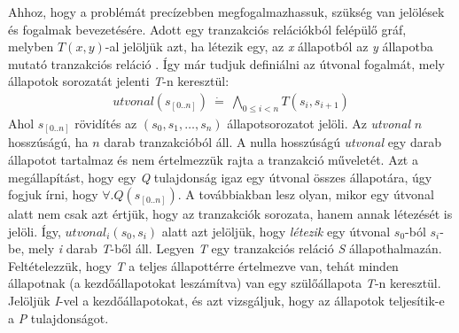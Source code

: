 Ahhoz, hogy a problémát precízebben megfogalmazhassuk, szükség van jelölések és fogalmak bevezetésére. Adott egy tranzakciós relációkból felépülő gráf, melyben $T(x, y)$-al jelöljük azt, ha létezik egy, az \emph{x} állapotból az \emph{y} állapotba mutató tranzakciós reláció \cite{k_induction_article}. Így már tudjuk definiálni az útvonal fogalmát, mely állapotok sorozatát jelenti \emph{T}-n keresztül:
\begin{align}
	utvonal(s_{[0..n]})~\dot{=}~\bigwedge_{0 \leq i < n} T(s_{i}, s_{i+1})
\end{align}
Ahol $s_{[0..n]}$ rövidítés az $(s_{0}, s_{1}, \dots, s_{n})$ állapotsorozatot jelöli. Az \emph{utvonal} $n$ hosszúságú, ha $n$ darab tranzakcióból áll. A nulla hosszúságú \emph{utvonal} egy darab állapotot tartalmaz és nem értelmezzük rajta a tranzakció műveletét. Azt a megállapítást, hogy egy \emph{Q} tulajdonság igaz egy útvonal összes állapotára, úgy fogjuk írni, hogy $\forall . Q(s_{[0..n]})$.
\newline
\newline
A továbbiakban lesz olyan, mikor egy útvonal alatt nem csak azt értjük, hogy az tranzakciók sorozata, hanem annak létezését is jelöli. Így, $utvonal_{i}(s_{0}, s_{i})$ alatt azt jelöljük, hogy \emph{létezik} egy útvonal $s_{0}$-ból $s_{i}$-be, mely \emph{i} darab \emph{T}-ből áll.
\newline
\newline
Legyen \emph{T} egy tranzakciós reláció \emph{S} állapothalmazán. Feltételezzük, hogy \emph{T} a teljes állapottérre értelmezve van, tehát minden állapotnak (a kezdőállapotokat leszámítva) van egy szülőállapota \emph{T}-n keresztül. Jelöljük \emph{I}-vel a kezdőállapotokat, és azt vizsgáljuk, hogy az állapotok teljesítik-e a \emph{P} tulajdonságot.


